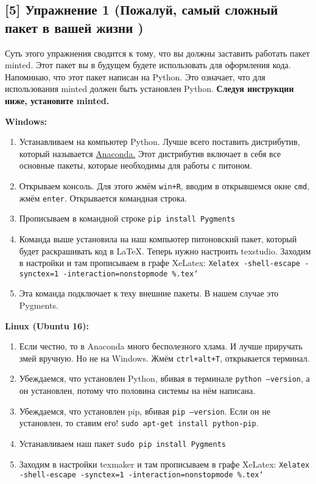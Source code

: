 \documentclass[12pt, a4paper, oneside]{article}
\begin{document}
\subsection*{[5]   Упражнение 1 (Пожалуй, самый сложный пакет в вашей жизни ) }

Суть этого упражнения сводится к тому, что вы должны заставить работать пакет minted.  Этот пакет вы в будущем будете использовать для оформления кода.  Напоминаю, что этот пакет написан на Python. Это означает, что для использования minted должен быть установлен Python. \textbf{Следуя инструкции ниже, установите minted.} 

\textbf{Windows:}

\begin{enumerate}
\item Устанавливаем на компьютер Python. Лучше всего поставить дистрибутив, который называется \href{https://docs.continuum.io/anaconda/install}{Anaconda.} Этот дистрибутив включает в себя все основные пакеты, которые необходимы для работы с питоном. 

\item Открываем консоль. Для этого жмём \texttt{win+R}, вводим в открывшемся окне \texttt{cmd}, жмём \texttt{enter}.  Открывается командная строка. 

\item Прописываем в командной строке \texttt{pip install Pygments}

\item Команда выше установила на наш компьютер питоновский пакет, который будет раскрашивать код в \LaTeX{}. Теперь нужно настроить texstudio. Заходим в настройки и там прописываем в графе  XeLatex: \newline  \texttt{Xelatex -shell-escape -synctex=1 -interaction=nonstopmode \%.tex`}

\item Эта команда подключает к теху внешние пакеты. В нашем случае это Pygments. 
\end{enumerate} 


\textbf{Linux (Ubuntu 16):}

\begin{enumerate}
\item Если честно, то в Anaconda много бесполезного хлама. И лучше приручать змей вручную. Но не на Windows. Жмём \texttt{ctrl+alt+T}, открывается терминал. 
\item Убеждаемся, что установлен Python, вбивая в терминале \texttt{python --version}, а он установлен, потому что половина системы на нём написана.
\item Убеждаемся, что установлен pip, вбивая  \texttt{pip --version}. Если он не установлен, то ставим его!  \texttt{sudo apt-get install python-pip}.
\item Устанавливаем наш пакет  \texttt{sudo pip install Pygments}
\item Заходим в настройки texmaker и там прописываем в графе  XeLatex:  \newline \texttt{Xelatex -shell-escape -synctex=1 -interaction=nonstopmode \%.tex`}
\end{enumerate} 
\end{document}
